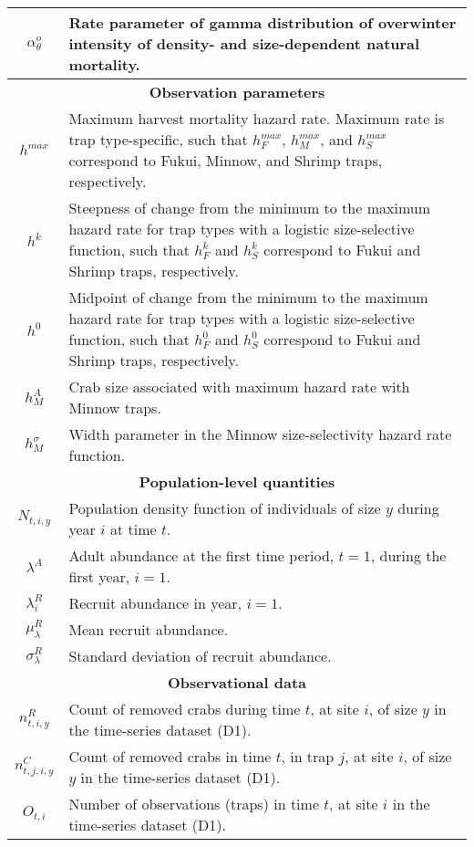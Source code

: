 \documentclass{article}
\begin{document}
\begin{longtable}{||c p{11cm}||}
 \hline
 $\alpha^o_{\theta}$ & Rate parameter of gamma distribution of overwinter intensity of density- and size-dependent natural mortality. \\ 
 \hline\hline
 \multicolumn{2}{||c||}{\textbf{Observation parameters}} \\ 
 \hline
 $h^{max}$ & Maximum harvest mortality hazard rate. Maximum rate is trap type-specific, such that $h_F^{max}$, $h_M^{max}$, and $h_S^{max}$ correspond to Fukui, Minnow, and Shrimp traps, respectively. \\ 
 \hline
 $h^{k}$ & Steepness of change from the minimum to the maximum hazard rate for trap types with a logistic size-selective function, such that $h_F^{k}$ and $h_S^{k}$ correspond to Fukui and Shrimp traps, respectively. \\ 
 \hline
 $h^{0}$ & Midpoint of change from the minimum to the maximum hazard rate for trap types with a logistic size-selective function, such that $h_F^{0}$ and $h_S^{0}$ correspond to Fukui and Shrimp traps, respectively. \\ 
 \hline
 $h_M^{A}$ & Crab size associated with maximum hazard rate with Minnow traps. \\ 
 \hline
 $h_M^{\sigma}$ & Width parameter in the Minnow size-selectivity hazard rate function. \\ 
 \hline\hline
 \multicolumn{2}{||c||}{\textbf{Population-level quantities}} \\ 
 \hline
 $N_{t,i,y}$ & Population density function of individuals of size $y$ during year $i$ at time $t$. \\ 
 \hline
 $\lambda^A$ & Adult abundance at the first time period, $t=1$, during the first year, $i=1$. \\
 \hline
 $\lambda^R_i$ & Recruit abundance in year, $i=1$. \\
 \hline
 $\mu^R_{\lambda}$ & Mean recruit abundance. \\
 \hline
 $\sigma^R_{\lambda}$ & Standard deviation of recruit abundance. \\
 \hline\hline
 \multicolumn{2}{||c||}{\textbf{Observational data}} \\ 
 \hline
 $n^R_{t,i,y}$ & Count of removed crabs during time $t$, at site $i$, of size $y$ in the time-series dataset (D1). \\ 
 \hline
 $n^C_{t,j,i,y}$ & Count of removed crabs in time $t$, in trap $j$, at site $i$, of size $y$ in the time-series dataset (D1). \\
 \hline
 $O_{t,i}$ & Number of observations (traps) in time $t$, at site $i$ in the time-series dataset (D1). \\
 \hline
\end{longtable}
\end{document}
